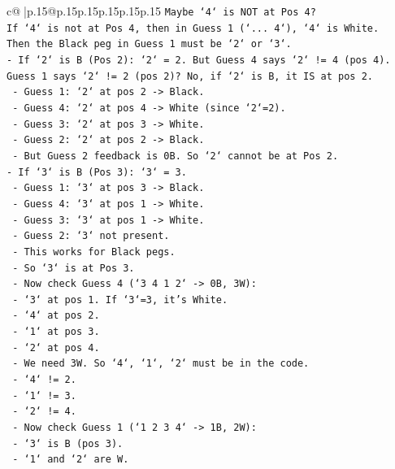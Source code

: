 \documentclass{article}
\begin{document}
{\begin{supertabular}{c@{$\;$}|p{.15\linewidth}@{}p{.15\linewidth}p{.15\linewidth}p{.15\linewidth}p{.15\linewidth}p{.15\linewidth}}
{{{\texttt{Maybe `4` is NOT at Pos 4?} \\
\texttt{If `4` is not at Pos 4, then in Guess 1 (`... 4`), `4` is White.} \\
\texttt{Then the Black peg in Guess 1 must be `2` or `3`.} \\
\texttt{{-} If `2` is B (Pos 2): `2` = 2. But Guess 4 says `2` != 4 (pos 4). Guess 1 says `2` != 2 (pos 2)? No, if `2` is B, it IS at pos 2.} \\
\texttt{    {-} Guess 1: `2` at pos 2 {-}> Black.} \\
\texttt{    {-} Guess 4: `2` at pos 4 {-}> White (since `2`=2).} \\
\texttt{    {-} Guess 3: `2` at pos 3 {-}> White.} \\
\texttt{    {-} Guess 2: `2` at pos 2 {-}> Black.} \\
\texttt{    {-} But Guess 2 feedback is 0B. So `2` cannot be at Pos 2.} \\
\texttt{{-} If `3` is B (Pos 3): `3` = 3.} \\
\texttt{    {-} Guess 1: `3` at pos 3 {-}> Black.} \\
\texttt{    {-} Guess 4: `3` at pos 1 {-}> White.} \\
\texttt{    {-} Guess 3: `3` at pos 1 {-}> White.} \\
\texttt{    {-} Guess 2: `3` not present.} \\
\texttt{    {-} This works for Black pegs.} \\
\texttt{    {-} So `3` is at Pos 3.} \\
\texttt{    {-} Now check Guess 4 (`3 4 1 2` {-}> 0B, 3W):} \\
\texttt{        {-} `3` at pos 1. If `3`=3, it's White.} \\
\texttt{        {-} `4` at pos 2.} \\
\texttt{        {-} `1` at pos 3.} \\
\texttt{        {-} `2` at pos 4.} \\
\texttt{        {-} We need 3W. So `4`, `1`, `2` must be in the code.} \\
\texttt{        {-} `4` != 2.} \\
\texttt{        {-} `1` != 3.} \\
\texttt{        {-} `2` != 4.} \\
\texttt{    {-} Now check Guess 1 (`1 2 3 4` {-}> 1B, 2W):} \\
\texttt{        {-} `3` is B (pos 3).} \\
\texttt{        {-} `1` and `2` are W.} \\
}}}
\end{supertabular}}
\end{document}
